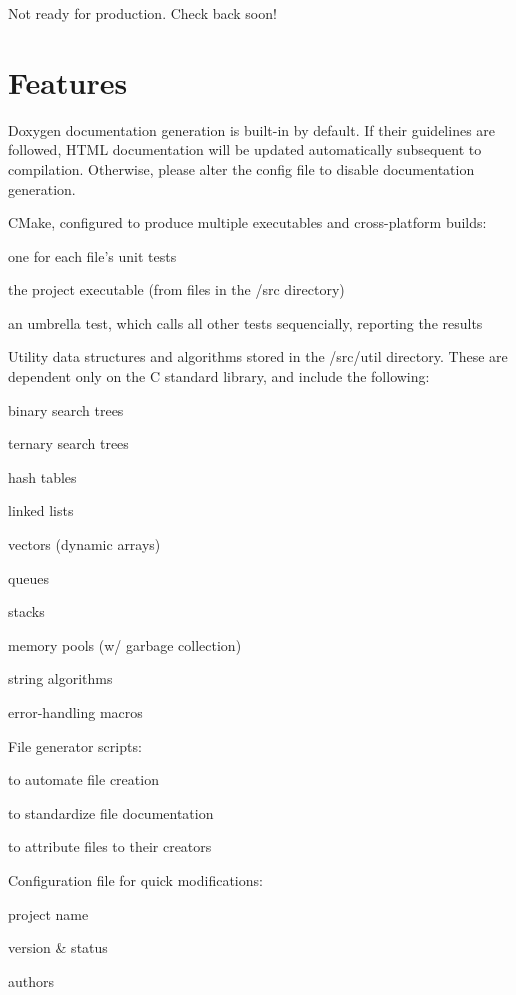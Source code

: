 
\begin{DoxyItemize}
\item Not ready for production. Check back soon!
\end{DoxyItemize}

\section*{Features }


\begin{DoxyItemize}
\item Doxygen documentation generation is built-\/in by default. If their guidelines are followed, H\+T\+M\+L documentation will be updated automatically subsequent to compilation. Otherwise, please alter the config file to disable documentation generation.
\item C\+Make, configured to produce multiple executables and cross-\/platform builds\+:
\begin{DoxyItemize}
\item one for each file's unit tests
\item the project executable (from files in the /src directory)
\item an umbrella test, which calls all other tests sequencially, reporting the results
\end{DoxyItemize}
\item Utility data structures and algorithms stored in the /src/util directory. These are dependent only on the C standard library, and include the following\+:
\begin{DoxyItemize}
\item binary search trees
\item ternary search trees
\item hash tables
\item linked lists
\item vectors (dynamic arrays)
\item queues
\item stacks
\item memory pools (w/ garbage collection)
\item string algorithms
\item error-\/handling macros
\end{DoxyItemize}
\item File generator scripts\+:
\begin{DoxyItemize}
\item to automate file creation
\item to standardize file documentation
\item to attribute files to their creators
\end{DoxyItemize}
\item Configuration file for quick modifications\+:
\begin{DoxyItemize}
\item project name
\item version \& status
\item authors
\end{DoxyItemize}
\end{DoxyItemize}

